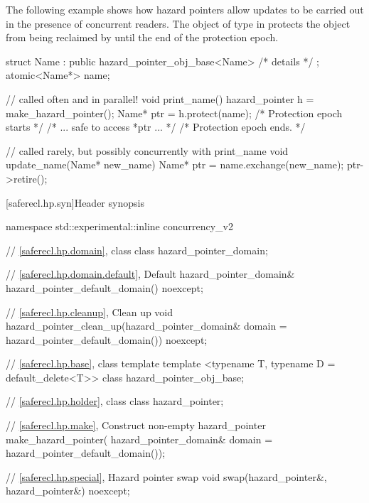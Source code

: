 \begin{example} The following example shows how hazard pointers allow updates to be carried out in the presence of concurrent readers. The object of type  in  protects the object  from being reclaimed by  until the end of the protection epoch.

\begin{codeblock}
struct Name : public hazard_pointer_obj_base<Name> { /* details */ };
atomic<Name*> name;

// called often and in parallel!
void print_name() {
  hazard_pointer h = make_hazard_pointer();
  Name* ptr = h.protect(name); /* Protection epoch starts */
  /* ... safe to access *ptr ... */
} /* Protection epoch ends. */

// called rarely, but possibly concurrently with print_name
void update_name(Name* new_name) {
  Name* ptr = name.exchange(new_name);
  ptr->retire();
}
\end{codeblock}
\end{example}

[saferecl.hp.syn]{Header  synopsis}

\begin{codeblock}
namespace std::experimental::inline concurrency_v2 {
  // \ref{saferecl.hp.domain}, class 
  class hazard_pointer_domain;

  // \ref{saferecl.hp.domain.default}, Default 
  hazard_pointer_domain& hazard_pointer_default_domain() noexcept;

  // \ref{saferecl.hp.cleanup}, Clean up
  void hazard_pointer_clean_up(hazard_pointer_domain& domain = hazard_pointer_default_domain())
    noexcept;

  // \ref{saferecl.hp.base}, class template 
  template <typename T, typename D = default_delete<T>> class hazard_pointer_obj_base;

  // \ref{saferecl.hp.holder}, class 
  class hazard_pointer;

  // \ref{saferecl.hp.make}, Construct non-empty 
  hazard_pointer make_hazard_pointer(
    hazard_pointer_domain& domain = hazard_pointer_default_domain());

  // \ref{saferecl.hp.special}, Hazard pointer swap
  void swap(hazard_pointer&, hazard_pointer&) noexcept;
}
\end{codeblock}

